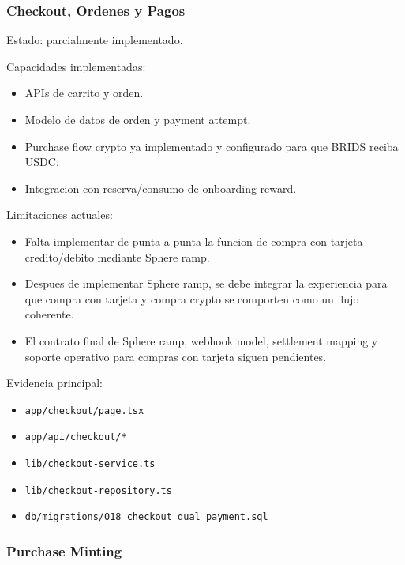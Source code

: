 \documentclass[
  10pt,
  letterpaper,
]{article}
\providecommand{\tightlist}{%
  \setlength{\itemsep}{0pt}\setlength{\parskip}{0pt}}
\let\oldtexttt\texttt
\renewcommand{\texttt}[1]{\oldtexttt{\small #1}}
\begin{document}
\subsubsection{Checkout, Ordenes y
Pagos}\label{checkout-ordenes-y-pagos}

Estado: parcialmente implementado.

Capacidades implementadas:

\begin{itemize}
\tightlist
\item
  APIs de carrito y orden.
\item
  Modelo de datos de orden y payment attempt.
\item
  Purchase flow crypto ya implementado y configurado para que BRIDS
  reciba USDC.
\item
  Integracion con reserva/consumo de onboarding reward.
\end{itemize}

Limitaciones actuales:

\begin{itemize}
\tightlist
\item
  Falta implementar de punta a punta la funcion de compra con tarjeta
  credito/debito mediante Sphere ramp.
\item
  Despues de implementar Sphere ramp, se debe integrar la experiencia
  para que compra con tarjeta y compra crypto se comporten como un flujo
  coherente.
\item
  El contrato final de Sphere ramp, webhook model, settlement mapping y
  soporte operativo para compras con tarjeta siguen pendientes.
\end{itemize}

Evidencia principal:

\begin{itemize}
\tightlist
\item
  \texttt{app/checkout/page.tsx}
\item
  \texttt{app/api/checkout/*}
\item
  \texttt{lib/checkout-service.ts}
\item
  \texttt{lib/checkout-repository.ts}
\item
  \texttt{db/migrations/018\_checkout\_dual\_payment.sql}
\end{itemize}

\subsubsection{Purchase Minting}\label{purchase-minting}
\end{document}
